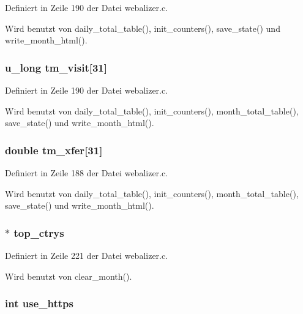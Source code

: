 Definiert in Zeile 190 der Datei webalizer.c.

Wird benutzt von daily\_\-total\_\-table(), init\_\-counters(), save\_\-state() und write\_\-month\_\-html().
\subsubsection{\setlength{\rightskip}{0pt plus 5cm}u\_\-long {\bf tm\_\-visit}[31]}\label{webalizer_8h_f3d33c8d579ff7b3d41abb0e618f70a5}




Definiert in Zeile 190 der Datei webalizer.c.

Wird benutzt von daily\_\-total\_\-table(), init\_\-counters(), month\_\-total\_\-table(), save\_\-state() und write\_\-month\_\-html().
\subsubsection{\setlength{\rightskip}{0pt plus 5cm}double {\bf tm\_\-xfer}[31]}\label{webalizer_8h_d8577082542e8d61ae9d21b5cdc09de6}




Definiert in Zeile 188 der Datei webalizer.c.

Wird benutzt von daily\_\-total\_\-table(), init\_\-counters(), month\_\-total\_\-table(), save\_\-state() und write\_\-month\_\-html().
\subsubsection{$\ast$ {\bf top\_\-ctrys}}\label{webalizer_8h_acb9022e3fedc2d14e55e9854fa3cbcf}




Definiert in Zeile 221 der Datei webalizer.c.

Wird benutzt von clear\_\-month().
\subsubsection{\setlength{\rightskip}{0pt plus 5cm}int {\bf use\_\-https}}\label{webalizer_8h_d821baa693a77d314549e3556fd6534a}




